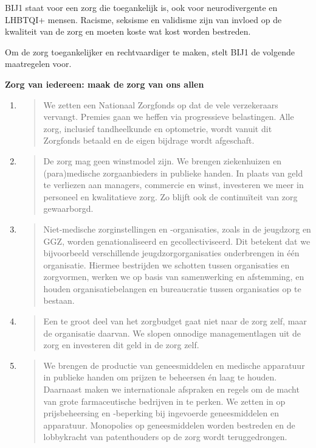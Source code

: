BIJ1 staat voor een zorg die toegankelijk is, ook voor neurodivergente
en LHBTQI+ mensen. Racisme, seksisme en validisme zijn van invloed op de
kwaliteit van de zorg en moeten koste wat kost worden bestreden.~

Om de zorg toegankelijker en rechtvaardiger te maken, stelt BIJ1 de
volgende maatregelen voor.

\textbf{Zorg van iedereen: maak de zorg van ons allen}

\begin{enumerate}
\def\labelenumi{\arabic{enumi}.}
\item
  \begin{quote}
  We zetten een Nationaal Zorgfonds op dat de vele verzekeraars
  vervangt. Premies gaan we heffen via progressieve belastingen. Alle
  zorg, inclusief tandheelkunde en optometrie, wordt vanuit dit
  Zorgfonds betaald en de eigen bijdrage wordt afgeschaft.
  \end{quote}
\item
  \begin{quote}
  De zorg mag geen winstmodel zijn. We brengen ziekenhuizen en
  (para)medische zorgaanbieders in publieke handen. In plaats van geld
  te verliezen aan managers, commercie en winst, investeren we meer in
  personeel en kwalitatieve zorg. Zo blijft ook de continuïteit van zorg
  gewaarborgd.
  \end{quote}
\item
  \begin{quote}
  Niet-medische zorginstellingen en -organisaties, zoals in de jeugdzorg
  en GGZ, worden genationaliseerd en gecollectiviseerd. Dit betekent dat
  we bijvoorbeeld verschillende jeugdzorgorganisaties onderbrengen in
  één organisatie. Hiermee bestrijden we schotten tussen organisaties en
  zorgvormen, werken we op basis van samenwerking en afstemming, en
  houden organisatiebelangen en bureaucratie tussen organisaties op te
  bestaan.
  \end{quote}
\item
  \begin{quote}
  Een te groot deel van het zorgbudget gaat niet naar de zorg zelf, maar
  de organisatie daarvan. We slopen onnodige managementlagen uit de zorg
  en investeren dit geld in de zorg zelf.
  \end{quote}
\item
  \begin{quote}
  We brengen de productie van geneesmiddelen en medische apparatuur in
  publieke handen om prijzen te beheersen én laag te houden. Daarnaast
  maken we internationale afspraken en regels om de macht van grote
  farmaceutische bedrijven in te perken. We zetten in op prijsbeheersing
  en -beperking bij ingevoerde geneesmiddelen en apparatuur. Monopolies
  op geneesmiddelen worden bestreden en de lobbykracht van patenthouders
  op de zorg wordt teruggedrongen.
  \end{quote}
\end{enumerate}

